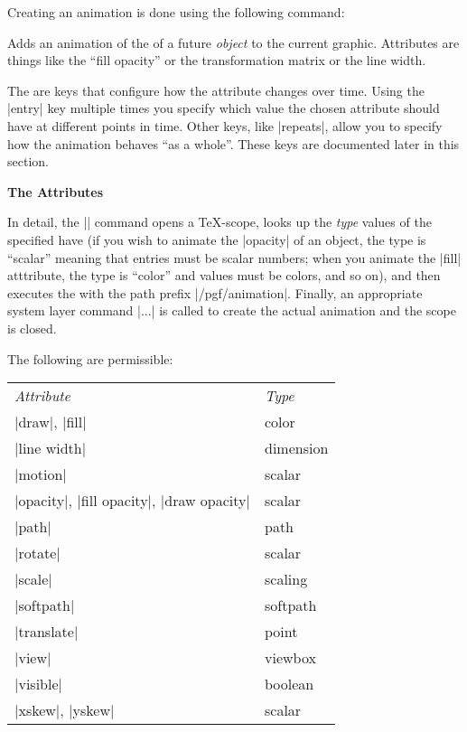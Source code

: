 Creating an animation is done using the following command:

\begin{command}{\pgfanimateattribute{}}
  Adds an animation of the  of a future \emph{object}
  to the current graphic. Attributes are things like the ``fill
  opacity'' or the transformation matrix or the line width.

  The  are keys that configure how the attribute changes
  over time. Using the |entry| key multiple times you specify which
  value the chosen attribute should have at different points in
  time. Other keys, like |repeats|, allow you to specify how the
  animation behaves ``as a whole''. These keys are documented later in
  this section.

\begin{codeexample}[]
\end{codeexample}

  \medskip
  \textbf{The Attributes}
  
  In detail, the |\pgfanimateattribute| command opens a \TeX-scope,
  looks up the \emph{type} values of the specified 
  have (if you wish to animate the |opacity| of an object, the type is
  ``scalar'' meaning that entries must be scalar numbers; when you
  animate the |fill| atttribute, the type is ``color'' and values 
  must be colors, and so on), and then executes the  with
  the path prefix |/pgf/animation|. Finally, an appropriate system
  layer command |\pgfsysanimate...| is called to create the actual
  animation and the scope is closed.

  The following  are permissible:
  
  \begin{tabular}{ll}
    \emph{Attribute} & \emph{Type} \\
    |draw|, |fill|              & color \\
    |line width|                & dimension \\
    |motion|                    & scalar \\
    |opacity|, |fill opacity|, |draw opacity|              & scalar \\
    |path|                      & path \\
    |rotate|                    & scalar \\
    |scale|                     & scaling \\
    |softpath|                  & softpath \\
    |translate|                 & point \\
    |view|                      & viewbox \\
    |visible|                   & boolean \\
    |xskew|, |yskew|            & scalar \\
  \end{tabular}


\end{command}
